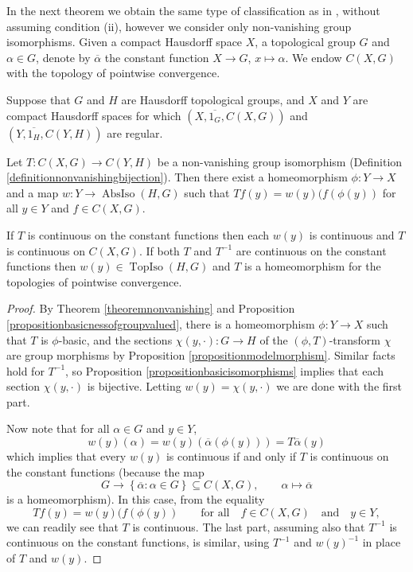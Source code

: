 In the next theorem we obtain the same type of classification as in \cite[Theorem 3.7]{MR2324919}, without assuming condition (ii), however we consider only non-vanishing group isomorphisms. Given a compact Hausdorff space $X$, a topological group $G$ and $\alpha\in G$, denote by $\overline{\alpha}$ the constant function $X\to G$, $x\mapsto \alpha$. We endow $C(X,G)$ with the topology of pointwise convergence.

\begin{theorem}%
Suppose that $G$ and $H$ are Hausdorff topological groups, and $X$ and $Y$ are compact Hausdorff spaces for which $(X,\overline{1_G},C(X,G))$ and $(Y,\overline{1_H},C(Y,H))$ are regular.

Let $T:C(X,G)\to C(Y,H)$ be a non-vanishing group isomorphism (Definition \ref{definitionnonvanishingbijection}). Then there exist a homeomorphism $\phi:Y\to X$ and a map $w:Y\to\operatorname{AbsIso}(H,G)$ such that $Tf(y)=w(y)(f(\phi(y))$ for all $y\in Y$ and $f\in C(X,G)$.

If $T$ is continuous on the constant functions then each $w(y)$ is continuous and $T$ is continuous on $C(X,G)$. If both $T$ and $T^{-1}$ are continuous on the constant functions then $w(y)\in\operatorname{TopIso}(H,G)$ and $T$ is a homeomorphism for the topologies of pointwise convergence.
\end{theorem}
\begin{proof}
By Theorem \ref{theoremnonvanishing} and Proposition \ref{propositionbasicnessofgroupvalued}, there is a homeomorphism $\phi:Y\to X$ such that $T$ is $\phi$-basic, and the sections $\chi(y,\cdot):G\to H$ of the $(\phi,T)$-transform $\chi$ are group morphisms by Proposition \ref{propositionmodelmorphism}. Similar facts hold for $T^{-1}$, so Proposition \ref{propositionbasicisomorphisms} implies that each section $\chi(y,\cdot)$ is bijective. Letting $w(y)=\chi(y,\cdot)$ we are done with the first part.

Now note that for all $\alpha\in G$ and $y\in Y$,
\[w(y)(\alpha)=w(y)(\overline{\alpha}(\phi(y)))=T\overline{\alpha}(y)\]
which implies that every $w(y)$ is continuous if and only if $T$ is continuous on the constant functions (because the map
\[G\to\left\{\overline{\alpha}:\alpha\in G\right\}\subseteq C(X,G),\qquad\alpha\mapsto\overline{\alpha}\]
is a homeomorphism). In this case, from the equality
\[Tf(y)=w(y)(f(\phi(y))\qquad\text{for all}\quad f\in C(X,G)\quad\text{and}\quad y\in Y,\]
we can readily see that $T$ is continuous. The last part, assuming also that $T^{-1}$ is continuous on the constant functions, is similar, using $T^{-1}$ and $w(y)^{-1}$ in place of $T$ and $w(y)$.\qedhere
\end{proof}

